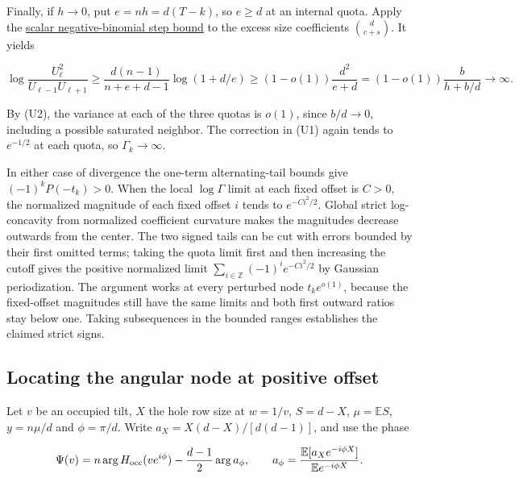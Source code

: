 Finally, if $h\to0$, put $e=nh=d(T-k)$, so $e\ge d$ at an internal quota. Apply the \href{https://github.com/ProgramComputer/open-math-research/blob/04564a728c21eab6ce511b98a48ccaac754648ff/topics/balanced-arrays/very-tall/very-tall-upper-quota.md#the-last-od-quotas}{scalar negative-binomial step bound} to the excess size coefficients $\binom d{c+s}$. It yields

\begin{equation*}
\log\frac{U_\ell^2}{U_{\ell-1}U_{\ell+1}}
\ge \frac{d(n-1)}{n+e+d-1}\log(1+d/e)
\ge (1-o(1))\frac{d^2}{e+d}
=(1-o(1))\frac{b}{h+b/d}\longrightarrow\infty.
\end{equation*}

By (U2), the variance at each of the three quotas is $o(1)$, since $b/d\to0$, including a possible saturated neighbor. The correction in (U1) again tends to $e^{-1/2}$ at each quota, so $\Gamma_k\to\infty$.

In either case of divergence the one-term alternating-tail bounds give $(-1)^kP(-t_k)>0$. When the local $\log\Gamma$ limit at each fixed offset is $C>0$, the normalized magnitude of each fixed offset $i$ tends to $e^{-Ci^2/2}$. Global strict log-concavity from normalized coefficient curvature makes the magnitudes decrease outwards from the center. The two signed tails can be cut with errors bounded by their first omitted terms; taking the quota limit first and then increasing the cutoff gives the positive normalized limit $\sum_{i\in\mathbb Z}(-1)^i e^{-Ci^2/2}$ by Gaussian periodization. The argument works at every perturbed node $t_ke^{o(1)}$, because the fixed-offset magnitudes still have the same limits and both first outward ratios stay below one. Taking subsequences in the bounded ranges establishes the claimed strict signs.

\subsection{Locating the angular node at positive offset}

Let $v$ be an occupied tilt, $X$ the hole row size at $w=1/v$, $S=d-X$, $\mu=\mathbb ES$, $y=n\mu/d$ and $\phi=\pi/d$. Write $a_X=X(d-X)/[d(d-1)]$, and use the phase

\begin{equation*}
\Psi(v)=n\arg H_{\rm occ}(ve^{i\phi})-\frac{d-1}{2}\arg a_\phi,\qquad
a_\phi=\frac{\mathbb E[a_Xe^{-i\phi X}]}{\mathbb E e^{-i\phi X}} .
\end{equation*}

